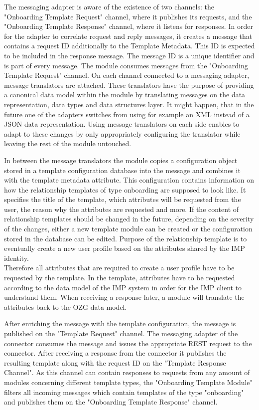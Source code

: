 The messaging adapter is aware of the existence of two channels: the "Onboarding Template Request" channel, where it publishes its requests, and the "Onboarding Template Response" channel, where it listens for responses. In order for the adapter to correlate request and reply messages, it creates a message that contains a request ID additionally to the Template Metadata. This ID is expected to be included in the response message. The message ID is a unique identifier and is part of every message. The module consumes messages from the "Onboarding Template Request" channel. On each channel connected to a messaging adapter, message translators are attached. These translators have the purpose of providing a canonical data model within the module by translating messages on the data representation, data types and data structures layer. It might happen, that in the future one of the adapters switches from using for example an XML instead of a JSON data representation. Using message translators on each side enables to adapt to these changes by only appropriately configuring the translator while leaving the rest of the module untouched.

In between the message translators the module copies a configuration object stored in a template configuration database into the message and combines it with the template metadata attribute. This configuration contains information on how the relationship templates of type onboarding are supposed to look like. It specifies the title of the template, which attributes will be requested from the user, the reason why the attributes are requested and more. If the content of relationship templates should be changed in the future, depending on the severity of the changes, either a new template module can be created or the configuration stored in the database can be edited. Purpose of the relationship template is to eventually create a new user profile based on the attributes shared by the IMP identity. \\ 
Therefore all attributes that are required to create a user profile have to be requested by the template. In the template, attributes have to be requested according to the data model of the IMP system in order for the IMP client to understand them. When receiving a response later, a module will translate the attributes back to the OZG data model.

After enriching the message with the template configuration, the message is published on the "Template Request" channel. The messaging adapter of the connector consumes the message and issues the appropriate REST request to the connector. After receiving a response from the connector it publishes the resulting template along with the request ID on the "Template Response Channel". As this channel can contain responses to requests from any amount of modules concerning different template types, the "Onboarding Template Module" filters all incoming messages which contain templates of the type "onboarding" and publishes them on the "Onboarding Template Response" channel.

